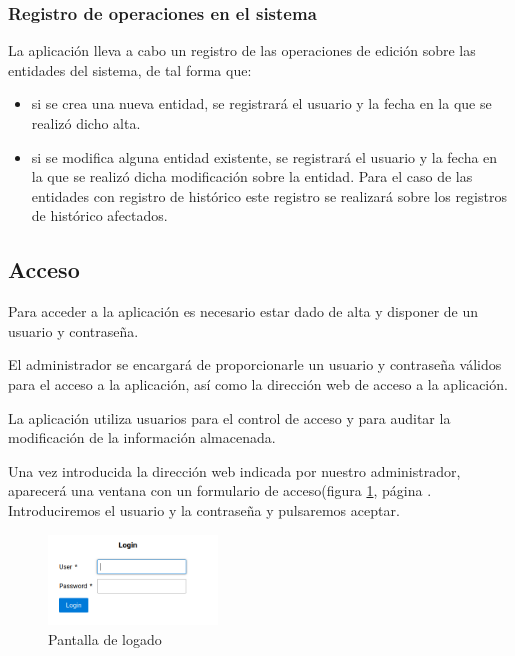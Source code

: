 \subsubsection{Registro de operaciones en el sistema}
\label{sub:registro-operaciones}

La aplicación lleva a cabo un registro de las operaciones de edición sobre las entidades del sistema, de tal forma que:

\begin{itemize}
\item si se crea una nueva entidad, se registrará el usuario y la fecha en la que se realizó dicho alta.
\item si se modifica alguna entidad existente, se registrará el usuario y la fecha en la que se realizó dicha modificación sobre la entidad. Para el caso de las entidades con registro de histórico este registro se realizará sobre los registros de histórico afectados.
\end{itemize}



\subsection{Acceso}

Para acceder a la aplicación es necesario estar dado de alta y disponer de un
usuario y contraseña.

El administrador se encargará de proporcionarle un usuario y contraseña válidos para el acceso a la aplicación, así como la dirección web de acceso a la aplicación.

La aplicación utiliza usuarios para el control de acceso y para auditar la
modificación de la información almacenada. 

Una vez introducida la dirección web indicada por nuestro administrador, aparecerá una ventana con un formulario de acceso(figura \ref{fig:login}, página \pageref{fig:login}. Introduciremos el usuario y la contraseña y pulsaremos aceptar. 


\begin{figure}[H]
  \centering
  \includegraphics[width=0.40\textwidth]{imaxes/login.png}
  \caption{Pantalla de logado}
  \label{fig:login}
\end{figure}

